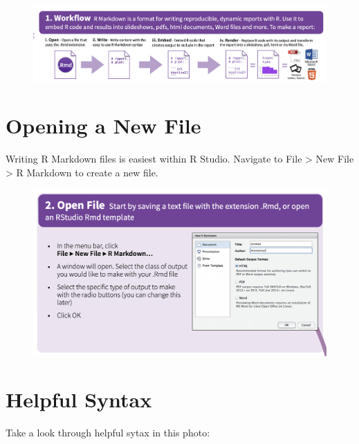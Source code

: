 \documentclass[]{book}
\begin{document}
\begin{figure}
\centering
\includegraphics{images/workflow.png}
\caption{}
\end{figure}

\section{Opening a New File}\label{opening-a-new-file}

Writing R Markdown files is easiest within R Studio. Navigate to File
\textgreater{} New File \textgreater{} R Markdown to create a new file.

\begin{figure}
\centering
\includegraphics{images/open.png}
\caption{}
\end{figure}

\section{Helpful Syntax}\label{helpful-syntax}

Take a look through helpful sytax in this photo:
\end{document}

